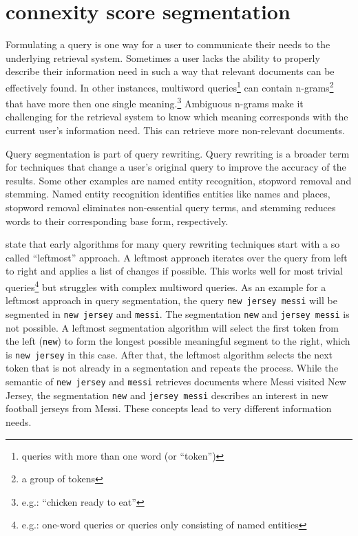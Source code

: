 \section{connexity score segmentation} \label{approach1}

Formulating a query is one way for a user to communicate their needs to the underlying retrieval system. Sometimes a user lacks the ability to properly describe their information need in such a way that relevant documents can be effectively found. In other instances, multiword queries\footnote{queries with more than one word (or ``token'')} can contain n-grams\footnote{a group of tokens} that have more then one single meaning.\footnote{e.g.: ``chicken ready to eat''} Ambiguous n-grams make it challenging for the retrieval system to know which meaning corresponds with the current user's information need. This can retrieve more non-relevant documents.

Query segmentation is part of query rewriting. Query rewriting is a broader term for techniques that change a user's original query to improve the accuracy of the results. Some other examples are named entity recognition, stopword removal and stemming. Named entity recognition identifies entities like names and places, stopword removal eliminates non-essential query terms, and stemming reduces words to their corresponding base form, respectively.

\citet{Risvik:2003} state that early algorithms for many query rewriting techniques start with a so called ``leftmost'' approach. A leftmost approach iterates over the query from left to right and applies a list of changes if possible. This works well for most trivial queries\footnote{e.g.: one-word queries or queries only consisting of named entities} but struggles with complex multiword queries. As an example for a leftmost approach in query segmentation, the query \texttt{new jersey messi} will be segmented in \texttt{new jersey} and \texttt{messi}. The segmentation \texttt{new} and \texttt{jersey messi} is not possible. A leftmost segmentation algorithm will select the first token from the left (\texttt{new}) to form the longest possible meaningful segment to the right, which is \texttt{new jersey} in this case. After that, the leftmost algorithm selects the next token that is not already in a segmentation and repeats the process. While the semantic of \texttt{new jersey} and \texttt{messi} retrieves documents where Messi visited New Jersey, the segmentation \texttt{new} and \texttt{jersey messi} describes an interest in new football jerseys from Messi. These concepts lead to very different information needs.


